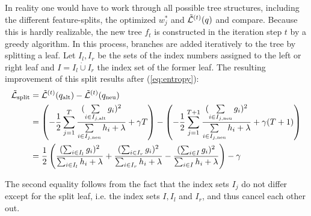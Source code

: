 In reality one would have to work through all possible tree structures, including the different feature-splits, the optimized $w^*_j$ and $\tilde{\mathcal{L}}^{(t)} (q)$ and compare. Because this is hardly realizable, the new tree $f_t$ is constructed in the iteration step $t$ by a greedy algorithm. In this process, branches are added iteratively to the tree by splitting a leaf. Let $I_l, I_r$ be the sets of the index numbers assigned to the left or right leaf and $I = I_l \dot\cup I_r$ the index set of the former leaf. The resulting improvement of this split results after (\ref{eq:entropy}):
\begin{equation} \label{eq:LRsplit}
	\begin{split}
		\tilde{\mathcal{L}}_\text{split} &= \tilde{\mathcal{L}}^{(t)} (q_\text{alt})-\tilde{\mathcal{L}}^{(t)} (q_\text{neu})\\
		&= \left( - \frac{1}{2} \sum_{j=1}^{T} \frac{(\sum\limits_{i \in I_{j, \text{alt}}} g_i)^2}{\sum\limits_{i \in I_{j, \text{neu}}} h_i + \lambda} + \gamma T \right)- \left( - \frac{1}{2} \sum_{j=1}^{T+1} \frac{(\sum\limits_{i \in I_{j, \text{neu}}} g_i)^2}{\sum\limits_{i \in I_{j, \text{neu}}} h_i + \lambda} + \gamma (T+1) \right)\\	
		&= \frac{1}{2} \left( \frac{(\sum_{i \in I_l} g_i)^2}{\sum_{i \in I_l} h_i + \lambda} + \frac{(\sum_{i \in I_r} g_i)^2}{\sum_{i \in I_r} h_i + \lambda} - \frac{(\sum_{i \in I} g_i)^2}{\sum_{i \in I} h_i + \lambda} \right) - \gamma 
	\end{split}
\end{equation}

The second equality follows from the fact that the index sets $I_j$ do not differ except for the split leaf, i.e. the index sets $I, I_l$ and $I_r$, and thus cancel each other out.


